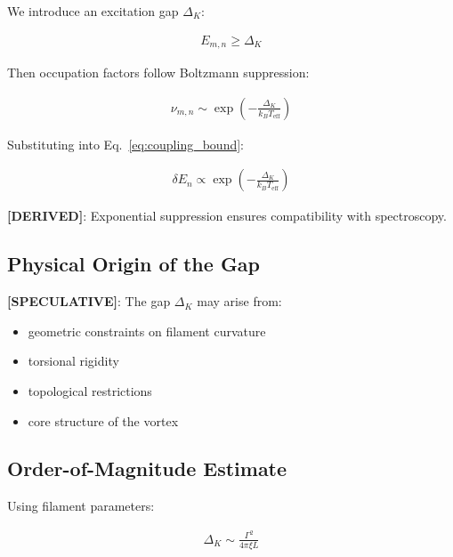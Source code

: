 \documentclass[11pt]{article}
\theoremstyle{definition}
\theoremstyle{plain}
\theoremstyle{remark}
\begin{document}
        We introduce an excitation gap $\Delta_K$:
        
        \begin{align}
            E_{m,n} \geq \Delta_K
        \end{align}
        
        Then occupation factors follow Boltzmann suppression:
        
        \begin{align}
            \nu_{m,n} \sim \exp\left(-\frac{\Delta_K}{k_B T_{\text{eff}}}\right)
        \end{align}
        
        Substituting into Eq.~\ref{eq:coupling_bound}:
        
        \begin{align}
            \delta E_n \propto \exp\left(-\frac{\Delta_K}{k_B T_{\text{eff}}}\right)
            \label{eq:boltzmann_suppression}
        \end{align}
        
        \textbf{[DERIVED]}:
        Exponential suppression ensures compatibility with spectroscopy.
    
    \subsection{Physical Origin of the Gap}
        
        \textbf{[SPECULATIVE]}:
        The gap $\Delta_K$ may arise from:
        
        \begin{itemize}
            \item geometric constraints on filament curvature
            \item torsional rigidity
            \item topological restrictions
            \item core structure of the vortex
        \end{itemize}
    
    \subsection{Order-of-Magnitude Estimate}
        
        Using filament parameters:
        
        \begin{align}
            \Delta_K \sim \frac{\Gamma^2}{4\pi \xi L}
        \end{align}
        
\end{document}
